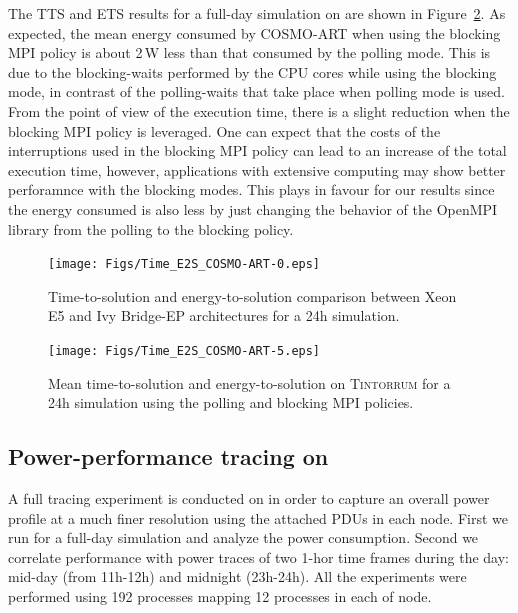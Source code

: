 The TTS and ETS results for a full-day simulation on \tinto are shown in Figure~\ref{fig:4}.  
As expected, the mean energy consumed by COSMO-ART when using the blocking MPI policy is about 
2\,W less than that consumed by the polling mode. This is due to the blocking-waits performed 
by the CPU cores while using the blocking mode, in contrast of the polling-waits that take 
place when polling mode is used. From the point of view of the execution time, there is a 
slight reduction when the blocking MPI policy is leveraged. One can expect that the costs of 
the interruptions used in the blocking MPI policy can lead to an increase of the total 
execution time, however, applications with extensive computing may show better perforamnce with 
the blocking modes. This plays in favour for our results since the energy consumed is also less 
by just changing the behavior of the OpenMPI library from the polling to the blocking policy.

\begin{figure}[htbf]
  \texttt{[image: Figs/Time\_E2S\_COSMO-ART-0.eps]}
  \caption{Time-to-solution and energy-to-solution comparison between
    Xeon E5 and Ivy Bridge-EP architectures for a 24h simulation.}
  \label{fig:3}
\end{figure}

\begin{figure}[htbf]
  \texttt{[image: Figs/Time\_E2S\_COSMO-ART-5.eps]}
  \caption{Mean time-to-solution and energy-to-solution on
    \textsc{Tintorrum} for a 24h simulation using the polling and blocking MPI policies.}
  \label{fig:4}
\end{figure}

\subsection{Power-performance tracing on \tinto}
\label{subsec:4.3}

A full tracing experiment is conducted on \tinto in order to capture an overall power
profile at a much finer resolution using the attached PDUs in each node. First we run \cosmoart 
for a full-day simulation and analyze the power consumption. Second we correlate performance 
with power traces of two 1-hor time frames during the day: mid-day (from 11h-12h) and
midnight (23h-24h). All the experiments were performed using 192 \cosmoart processes
mapping 12 processes in each of node.


